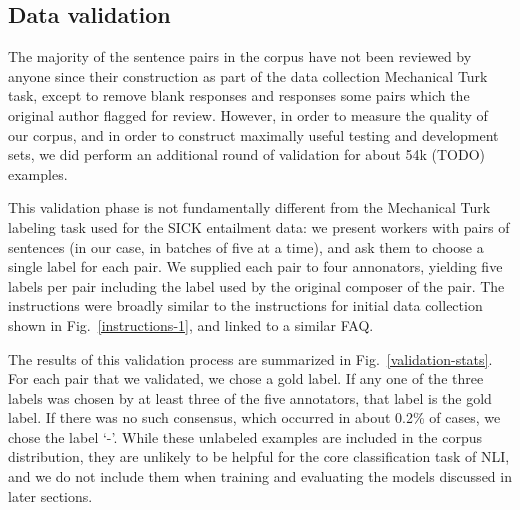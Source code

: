 
\subsection{Data validation}

The majority of the sentence pairs in the corpus have not been reviewed by anyone since their construction as part of the data collection Mechanical Turk task, except to remove blank responses and responses some pairs which the original author flagged for review. However, in order to measure the quality of our corpus, and in order to construct maximally useful testing and development sets, we did perform an additional round of validation for about 54k (TODO) examples.

This validation phase is not fundamentally different from the Mechanical Turk labeling task used for the SICK entailment data: we present workers with pairs of sentences (in our case, in batches of five at a time), and ask them to choose a single label for each pair. We supplied each pair to four annonators, yielding five labels per pair including the label used by the original composer of the pair. The instructions were broadly similar to the instructions for initial data collection shown in Fig.~\ref{instructions-1}, and linked to a similar FAQ.

The results of this validation process are summarized in Fig.~\ref{validation-stats}. For each pair that we validated, we chose a gold label. If any one of the three labels was chosen by at least three of the five annotators, that label is the gold label. If there was no such consensus, which occurred in about 0.2\% of cases, we chose the label `-'. While these unlabeled examples are included in the corpus distribution, they are unlikely to be helpful for the core classification task of NLI, and we do not include them when training and evaluating the models discussed in later sections.

